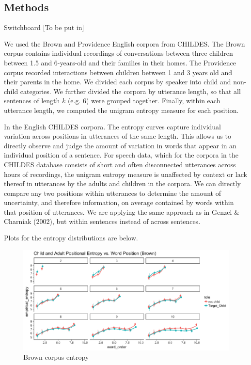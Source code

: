 \documentclass[10pt, letterpaper]{article}
\newenvironment{CodeChunk}{}{}
\begin{document}
\hypertarget{methods}{%
\subsection{Methods}\label{methods}}

Switchboard {[}To be put in{]}

We used the Brown and Providence English corpora from CHILDES. The Brown
corpus contains individual recordings of conversations between three
children between 1.5 and 6-years-old and their families in their homes.
The Providence corpus recorded interactions between children between 1
and 3 years old and their parents in the home. We divided each corpus by
speaker into child and non-child categories. We further divided the
corpora by utterance length, so that all sentences of length \(k\) (e.g.
\(6\)) were grouped together. Finally, within each utterance length, we
computed the unigram entropy measure for each position.

In the English CHILDES corpora. The entropy curves capture individual
variation across positions in utterances of the same length. This allows
us to directly observe and judge the amount of variation in words that
appear in an individual position of a sentence. For speech data, which
for the corpora in the CHILDES database consists of short and often
disconnected utterances across hours of recordings, the unigram entropy
measure is unaffected by context or lack thereof in utterances by the
adults and children in the corpora. We can directly compare any two
positions within utterances to determine the amount of uncertainty, and
therefore information, on average contained by words within that
position of utterances. We are applying the same approach as in Genzel
\& Charniak (2002), but within sentences instead of across sentences.

Plots for the entropy distributions are below.

\begin{CodeChunk}
\begin{figure}[h]

{\centering \includegraphics{figs/brown_PE-1} 

}

\caption[Brown corpus entropy]{Brown corpus entropy}\label{fig:brown_PE}
\end{figure}
\end{CodeChunk}
\end{document}
